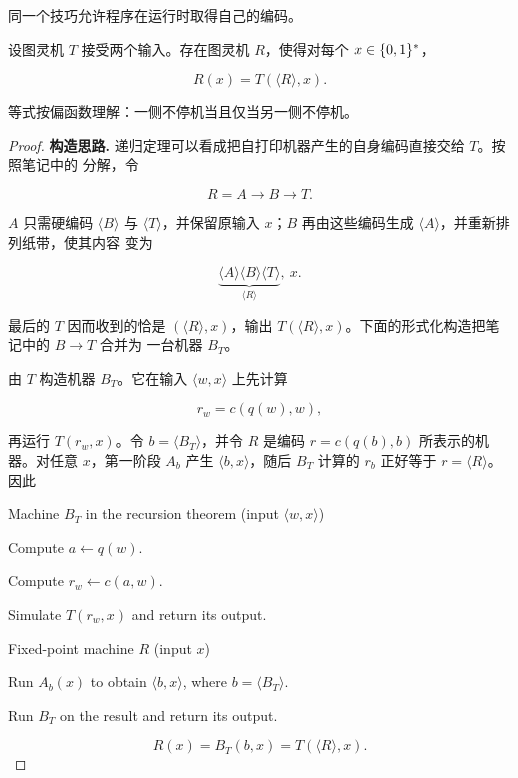 同一个技巧允许程序在运行时取得自己的编码。

\begin{theorem}
  \label{thm:recursion-theorem}
  设图灵机 $T$ 接受两个输入。存在图灵机 $R$，使得对每个
  $x\in\{0,1\}^{*}$，

  \[
    R(x)=T(\langle R\rangle,x).
  \]

  等式按偏函数理解：一侧不停机当且仅当另一侧不停机。
\end{theorem}

\begin{proof}
  \textbf{构造思路.}
  递归定理可以看成把自打印机器产生的自身编码直接交给 $T$。按照笔记中的
  分解，令

  \[
    R=A\to B\to T.
  \]

  $A$ 只需硬编码 $\langle B\rangle$ 与 $\langle T\rangle$，并保留原输入
  $x$；$B$ 再由这些编码生成 $\langle A\rangle$，并重新排列纸带，使其内容
  变为

  \[
    \underbrace{\langle A\rangle\langle B\rangle
      \langle T\rangle}_{\langle R\rangle},\ x.
  \]

  最后的 $T$ 因而收到的恰是 $(\langle R\rangle,x)$，输出
  $T(\langle R\rangle,x)$。下面的形式化构造把笔记中的 $B\to T$ 合并为
  一台机器 $B_T$。

  由 $T$ 构造机器 $B_T$。它在输入 $\langle w,x\rangle$ 上先计算

  \[
    r_w=c(q(w),w),
  \]

  再运行 $T(r_w,x)$。令 $b=\langle B_T\rangle$，并令 $R$ 是编码
  $r=c(q(b),b)$ 所表示的机器。对任意 $x$，第一阶段 $A_b$ 产生
  $\langle b,x\rangle$，随后 $B_T$ 计算的 $r_b$ 正好等于
  $r=\langle R\rangle$。因此

  \begin{pseudocode}{Machine $B_T$ in the recursion theorem
      (input $\langle w,x\rangle$)}
    \item Compute $a\gets q(w)$.
    \item Compute $r_w\gets c(a,w)$.
    \item Simulate $T(r_w,x)$ and return its output.
  \end{pseudocode}

  \begin{pseudocode}{Fixed-point machine $R$ (input $x$)}
    \item Run $A_b(x)$ to obtain $\langle b,x\rangle$, where
      $b=\langle B_T\rangle$.
    \item Run $B_T$ on the result and return its output.
  \end{pseudocode}

  \[
    R(x)=B_T(b,x)=T(\langle R\rangle,x).
  \]
\end{proof}

